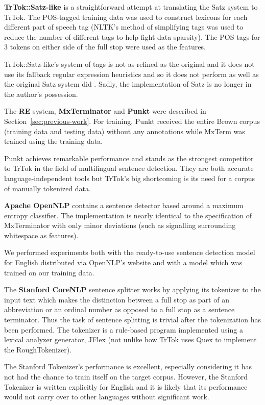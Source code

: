 \textbf{TrTok::Satz-like} is a straightforward attempt at translating
the Satz system to TrTok. The POS-tagged training data was used to
construct lexicons for each different part of speech tag (NLTK's
method of simplifying tags was used to reduce the number of different
tags to help fight data sparsity). The POS tags for 3 tokens on either
side of the full stop were used as the features.

TrTok::Satz-like's system of tags is not as refined as the original
and it does not use its fallback regular expression heuristics and so
it does not perform as well as the original Satz system did
\cite{sbd-satz}. Sadly, the implementation of Satz is no longer in the
author's possession.

The \textbf{RE} system, \textbf{MxTerminator} and \textbf{Punkt} were
described in Section~\ref{sec:previous-work}. For training, Punkt
received the entire Brown corpus (training data and testing data)
without any annotations while MxTerm was trained using the training
data.

Punkt achieves remarkable performance and stands as the strongest
competitor to TrTok in the field of multilingual sentence detection.
They are both accurate language-independent tools but TrTok's big
shortcoming is its need for a corpus of manually tokenized data.

\textbf{Apache OpenNLP} contains a sentence detector based around a
maximum entropy classifier. The implementation is nearly identical to
the specification of MxTerminator with only minor deviations (such as
signalling surrounding whitespace as features).

We performed experiments both with the ready-to-use sentence detection
model for English distributed via OpenNLP's website and with a model
which was trained on our training data.

The \textbf{Stanford CoreNLP} sentence splitter works by applying its
tokenizer to the input text which makes the distinction between a full
stop as part of an abbreviation or an ordinal number as opposed to a
full stop as a sentence terminator. Thus the task of sentence
splitting is trivial after the tokenization has been performed. The
tokenizer is a rule-based program implemented using a lexical analyzer
generator, JFlex (not unlike how TrTok uses Quex to implement the
RoughTokenizer).

The Stanford Tokenizer's performance is excellent, especially
considering it has not had the chance to train itself on the target
corpus. However, the Stanford Tokenizer is written explicitly for
English and it is likely that its performance would not carry over to
other languages without significant work.

